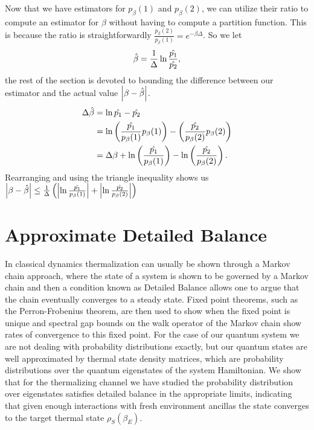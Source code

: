 \documentclass{article}
\newcommand{\abs}[1]{\left| #1 \right|}
\begin{document}
Now that we have estimators for $p_{\beta}(1)$ and $p_{\beta}(2)$, we can utilize their ratio to compute an estimator for $\beta$ without having to compute a partition function. This is because the ratio is straightforwardly $\frac{p_{\beta}(2)}{p_{\beta}(1)} = e^{-\beta \Delta}$. So we let 
\begin{equation}
    \Hat{\beta} = \frac{1}{\Delta} \ln \frac{\Hat{p_1}}{\Hat{p_2}},
\end{equation}
the rest of the section is devoted to bounding the difference between our estimator and the actual value $\abs{\beta - \Hat{\beta}}$.
\begin{align}
    \Delta \Hat{\beta} &= \ln \Hat{p_1} - \Hat{p_2} \\
    &= \ln \left( \frac{\Hat{p_1}}{p_{\beta}(1)} p_{\beta}(1)\right) - \left( \frac{\Hat{p_2}}{p_{\beta}(2)} p_{\beta}(2)\right) \\
    &= \Delta \beta + \ln \left( \frac{\Hat{p_1}}{p_{\beta}(1)}\right) - \ln \left( \frac{\Hat{p_2}}{p_{\beta}(2)}\right).
\end{align}
Rearranging and using the triangle inequality shows us $\abs{\beta - \Hat{\beta}} \leq \frac{1}{\Delta} \left( \abs{\ln \frac{\Hat{p_1}}{p_{\beta}(1)}} + \abs{\ln \frac{\Hat{p_2}}{p_{\beta}(2)}}  \right)$

\section{Approximate Detailed Balance}
In classical dynamics thermalization can usually be shown through a Markov chain approach, where the state of a system is shown to be governed by a Markov chain and then a condition known as Detailed Balance allows one to argue that the chain eventually converges to a steady state. Fixed point theorems, such as the Perron-Frobenius theorem, are then used to show when the fixed point is unique and spectral gap bounds on the walk operator of the Markov chain show rates of convergence to this fixed point. For the case of our quantum system we are not dealing with probability distributions exactly, but our quantum states are well approximated by thermal state density matrices, which are probability distributions over the quantum eigenstates of the system Hamiltonian. We show that for the thermalizing channel we have studied the probability distribution over eigenstates satisfies detailed balance in the appropriate limits, indicating that given enough interactions with fresh environment ancillas the state converges to the target thermal state $\rho_S(\beta_E)$.
\end{document}
